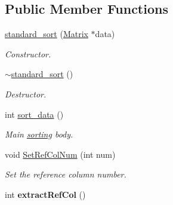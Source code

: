 \subsection*{Public Member Functions}
\begin{DoxyCompactItemize}
\item 
\hypertarget{classstandard__sort_a70a7e1ba1cae2d294b252f6182f81436}{
\hyperlink{classstandard__sort_a70a7e1ba1cae2d294b252f6182f81436}{standard\_\-sort} (\hyperlink{classMatrix}{Matrix} $\ast$data)}
\label{d4/dec/classstandard__sort_a70a7e1ba1cae2d294b252f6182f81436}

\begin{DoxyCompactList}\small\item\em Constructor. \item\end{DoxyCompactList}\item 
\hypertarget{classstandard__sort_af40099379c12e092519a20afbad5c6b9}{
\hyperlink{classstandard__sort_af40099379c12e092519a20afbad5c6b9}{$\sim$standard\_\-sort} ()}
\label{d4/dec/classstandard__sort_af40099379c12e092519a20afbad5c6b9}

\begin{DoxyCompactList}\small\item\em Destructor. \item\end{DoxyCompactList}\item 
\hypertarget{classstandard__sort_a34a0d914ebac6e328dfe371a1e1a8afb}{
int \hyperlink{classstandard__sort_a34a0d914ebac6e328dfe371a1e1a8afb}{sort\_\-data} ()}
\label{d4/dec/classstandard__sort_a34a0d914ebac6e328dfe371a1e1a8afb}

\begin{DoxyCompactList}\small\item\em Main \hyperlink{classsorting}{sorting} body. \item\end{DoxyCompactList}\item 
\hypertarget{classstandard__sort_a5bf11721c6c6147440c68409b830a31a}{
void \hyperlink{classstandard__sort_a5bf11721c6c6147440c68409b830a31a}{SetRefColNum} (int num)}
\label{d4/dec/classstandard__sort_a5bf11721c6c6147440c68409b830a31a}

\begin{DoxyCompactList}\small\item\em Set the reference column number. \item\end{DoxyCompactList}\item 
\hypertarget{classstandard__sort_a95aea45100dcdc939bfd51e98eefb202}{
int {\bfseries extractRefCol} ()}
\label{d4/dec/classstandard__sort_a95aea45100dcdc939bfd51e98eefb202}


\end{DoxyCompactItemize}
